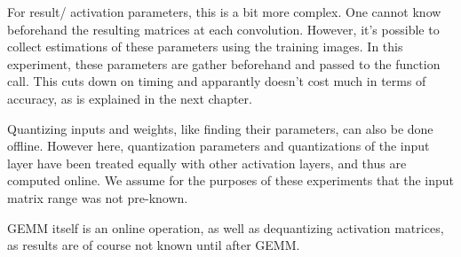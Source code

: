 For result/ activation parameters, this is a bit more complex. One cannot know beforehand the resulting matrices at each convolution. However, it's possible to collect estimations of these parameters using the training images. In this experiment, these parameters are gather beforehand and passed to the function call. This cuts down on timing and apparantly doesn't cost much in terms of accuracy, as is explained in the next chapter.

Quantizing inputs and weights, like finding their parameters, can also be done offline. However here, quantization parameters and quantizations of the input layer have been treated equally with other activation layers, and thus are computed online. We assume for the purposes of these experiments that the input matrix range was not pre-known.

GEMM itself is an online operation, as well as dequantizing activation matrices, as results are of course not known until after GEMM.